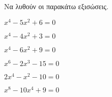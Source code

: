 Να λυθούν οι παρακάτω εξισώσεις.
\begin{multicols}{2}
\begin{alist}[leftmargin=3mm]
\item $ x^4-5x^2+6=0 $
\item $ x^4-4x^2+3=0 $
\item $ x^4-6x^2+9=0 $
\item $ x^6-2x^3-15=0 $
\item $ 2x^4-x^2-10=0 $
\item $ x^8-10x^4+9=0 $
\end{alist}
\end{multicols}
